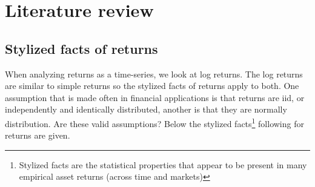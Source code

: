 \documentclass[a4paper, twoside]{templates/ociamthesis}
\begin{document}
\hypertarget{lit-rev}{%
\chapter{Literature review}\label{lit-rev}}

\minitoc 

\hypertarget{styl-facts}{%
\section{Stylized facts of returns}\label{styl-facts}}

\noindent When analyzing returns as a time-series, we look at log returns. The log returns are similar to simple returns so the stylized facts of returns apply to both. One assumption that is made often in financial applications is that returns are iid, or independently and identically distributed, another is that they are normally distribution. Are these valid assumptions? Below the stylized facts\footnote{Stylized facts are the statistical properties that appear to be present in many empirical asset returns (across time and markets)} following \textcite{annaert2021} for returns are given.
\end{document}
